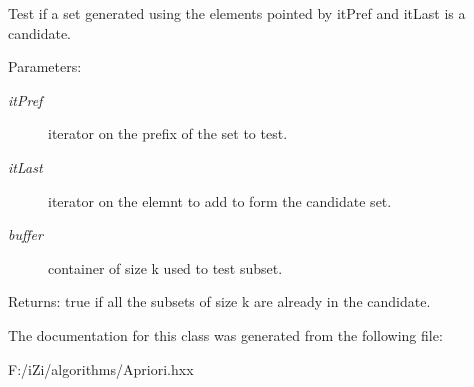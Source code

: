 Test if a set generated using the elements pointed by it\-Pref and it\-Last is a candidate. 

\begin{Desc}
\item[Parameters:]
\begin{description}
\item[{\em it\-Pref}]iterator on the prefix of the set to test. \item[{\em it\-Last}]iterator on the elemnt to add to form the candidate set. \item[{\em buffer}]container of size k used to test subset. \end{description}
\end{Desc}
\begin{Desc}
\item[Returns:]true if all the subsets of size k are already in the candidate. \end{Desc}


The documentation for this class was generated from the following file:\begin{CompactItemize}
\item 
F:/i\-Zi/algorithms/Apriori.hxx\end{CompactItemize}
